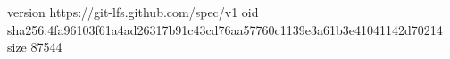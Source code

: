 version https://git-lfs.github.com/spec/v1
oid sha256:4fa96103f61a4ad26317b91c43cd76aa57760c1139e3a61b3e41041142d70214
size 87544
